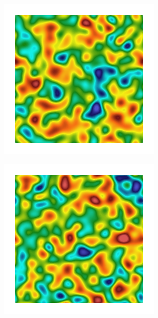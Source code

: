 \begin{figure}[!htb]
  \begin{subfigure}[b]{0.15\textwidth}
    \includegraphics[width=\textwidth]{Chapter4/figures/2D/Gc_sqexp_cartesian_5_5_rho_0_seed_c.png}
    \caption{}
    \label{fig: Chapter4/2D/Gc_sqexp_cartesian_5_5_rho_0_seed_c}
  \end{subfigure}
  \begin{subfigure}[b]{0.15\textwidth}
    \includegraphics[width=\textwidth]{Chapter4/figures/2D/psic_sqexp_cartesian_5_5_rho_0_seed_c.png}

\end{subfigure}
\end{figure}
